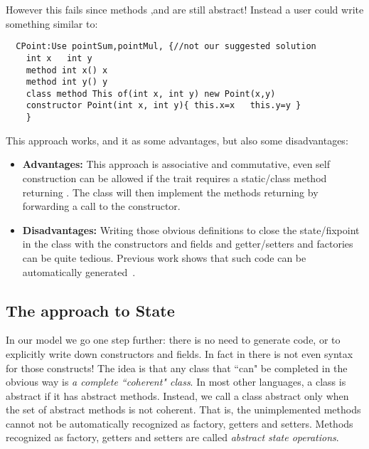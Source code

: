 \noindent However this fails since methods \Q@x@,\Q@y@ and \Q@of@ are still abstract!
Instead a user could write something similar to:

\begin{lstlisting}
  CPoint:Use pointSum,pointMul, {//not our suggested solution
    int x   int y
    method int x() x       
    method int y() y
    class method This of(int x, int y) new Point(x,y)
    constructor Point(int x, int y){ this.x=x   this.y=y }
    }
\end{lstlisting}

\noindent This approach works, and it as some advantages, but also
some disadvantages: 

\begin{itemize}

\item {\bf Advantages:} This approach is associative and commutative, even self construction
  can be allowed if the trait requires a static/class method
  returning \Q@This@. The class will then implement the methods returning \Q@This@
  by forwarding a call to the constructor.
  
\item {\bf Disadvantages:} Writing those obvious definitions to close
  the state/fixpoint in the class 
   with the constructors and fields and getter/setters and factories can be quite tedious.
   Previous work shows that such code can be automatically generated~\cite{wang2016classless}.

\end{itemize}

\subsection{The \name approach to State}

In our model we go one step further: there is no need to generate
code, or to explicitly write down constructors and fields. In fact in
\name there is not even syntax for those constructs!  The idea is that
any class that ``can" be completed in the obvious way  is \emph{a
  complete ``coherent" class}.  In most other languages, a class is
abstract if it has abstract methods.  Instead, we call a class
abstract only when the set of abstract methods is not coherent. That
is, the unimplemented methods cannot not be automatically recognized
as factory, getters and setters. Methods recognized as factory, getters and setters are called
\emph{abstract state operations}.
  

